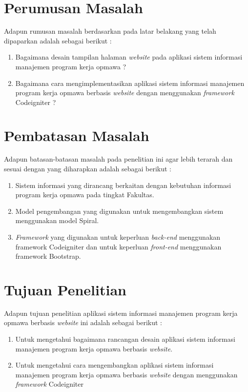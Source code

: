 \section{Perumusan Masalah}
Adapun rumusan masalah berdasarkan pada latar belakang yang telah dipaparkan adalah sebagai berikut :
\begin{enumerate}
	\item Bagaimana desain tampilan halaman \emph{website} pada aplikasi sistem informasi manajemen program kerja opmawa ?
	
	\item Bagaimana cara mengimplementasikan aplikasi sistem informasi manajemen program kerja opmawa berbasis \emph{website} dengan menggunakan \emph{framework} Codeigniter ?
\end{enumerate}

\section{Pembatasan Masalah}
Adapun batasan-batasan masalah pada penelitian ini agar lebih terarah dan sesuai dengan yang diharapkan adalah sebagai berikut :
\begin{enumerate}
	\item Sistem informasi yang dirancang berkaitan dengan kebutuhan informasi program kerja opmawa pada tingkat Fakultas.
	\item Model pengembangan yang digunakan untuk mengembangkan sistem menggunakan model Spiral.
	\item \textit{Framework} yang digunakan untuk keperluan \textit{back-end} menggunakan framework Codeigniter dan untuk keperluan \textit{front-end} menggunakan framework Bootstrap.
\end{enumerate}

\section{Tujuan Penelitian}
Adapun tujuan penelitian aplikasi sistem informasi manajemen program kerja opmawa berbasis \emph{website} ini adalah sebagai berikut : 
\begin{enumerate}
	\item Untuk mengetahui bagaimana rancangan desain aplikasi sistem informasi manajemen program kerja opmawa berbasis \emph{website}.
	\item Untuk mengetahui cara mengembangkan aplikasi sistem informasi manajemen program kerja opmawa berbasis \emph{website} dengan menggunakan \emph{framework} Codeigniter
\end{enumerate}

